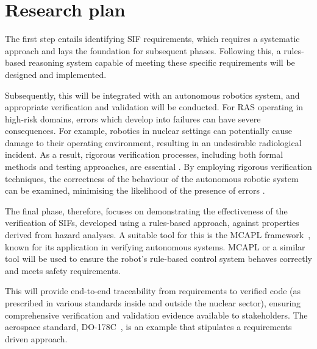 \documentclass[conference]{IEEEtran}
\begin{document}
\section{Research plan}
\label{sec:plan}

The first step entails identifying SIF requirements, which requires a systematic approach and lays the foundation for subsequent phases. Following this, a rules-based reasoning system capable of meeting these specific requirements will be designed and implemented.

Subsequently, this will be integrated with an autonomous robotics system, and appropriate verification and validation will be conducted. For RAS operating in high-risk domains, errors which develop into failures can have severe consequences. For example, robotics in nuclear settings can potentially cause damage to their operating environment, resulting in an undesirable radiological incident. As a result, rigorous verification processes, including both formal methods and testing approaches, are essential \cite{farrell2018robotics}. By employing rigorous verification techniques, the correctness of the behaviour of the autonomous robotic system can be examined, minimising the likelihood of the presence of errors . 

The final phase, therefore, focuses on demonstrating the effectiveness of the verification of SIFs, developed using a rules-based approach, against properties derived from hazard analyses. A suitable tool for this is the MCAPL framework~\cite{MCAPL}, known for its application in verifying autonomous systems. MCAPL or a similar tool will be used to ensure the robot's rule-based control system behaves correctly and meets safety requirements.

This will provide end-to-end traceability from requirements to verified code (as prescribed in various standards inside and outside the nuclear sector), ensuring comprehensive verification and validation evidence available to stakeholders. The aerospace standard, DO-178C~\cite{Do-178c}, is an example that stipulates a requirements driven approach.
\end{document}
